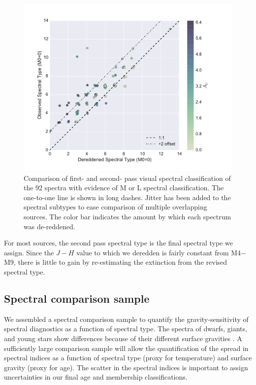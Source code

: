 \begin{figure}[ht!]
\caption{Comparison of first- and second- pass visual spectral classification of the 92 spectra with evidence of M or L spectral classification.  The one-to-one line is shown in long dashes.  Jitter has been added to the spectral subtypes to ease comparison of multiple overlapping sources.  The color bar indicates the amount by which each spectrum was de-reddened.  \label{fig_dereddened_comparison} }
\centering
\includegraphics[scale=0.5]{chIMACS/figures/dereddened_spt_comparison}
\end{figure}

For most sources, the second pass spectral type is the final spectral type we assign.  Since the $J-H$ value to which we deredden is fairly constant from M4$-$M9, there is little to gain by re-estimating the extinction from the revised spectral type.

\subsection{Spectral comparison sample}
We assembled a spectral comparison sample to quantify the gravity-sensitivity of spectral diagnostics as a function of spectral type.  The spectra of dwarfs, giants, and young stars show differences because of their different surface gravities \citep{2012AJ....143..114S}.  A sufficiently large comparison sample will allow the quantification of the spread in spectral indices as a function of spectral type (proxy for temperature) and surface gravity (proxy for age).  The scatter in the spectral indices is important to assign uncertainties in our final age and membership classifications.

